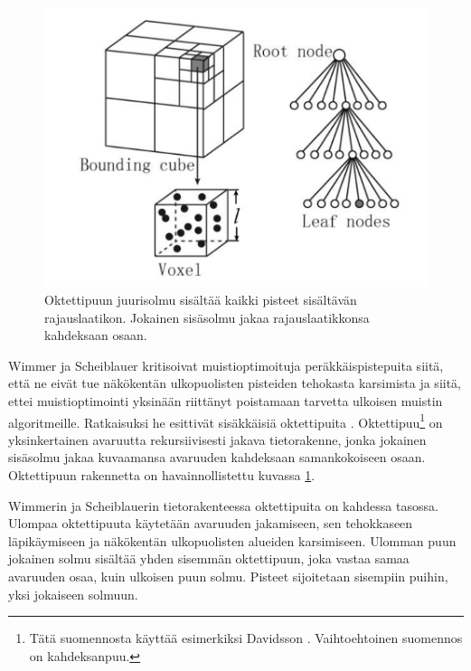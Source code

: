 \begin{figure}
    \centering
    \includegraphics[width=0.5\paperwidth]{img/octree.png}
    \caption{Oktettipuun juurisolmu sisältää kaikki pisteet sisältävän rajauslaatikon. Jokainen sisäsolmu jakaa rajauslaatikkonsa kahdeksaan osaan. \cite{octreekuva}}
    \label{img:octree}
\end{figure}

Wimmer ja Scheiblauer kritisoivat muistioptimoituja peräkkäispistepuita siitä, että ne eivät tue näkökentän ulkopuolisten pisteiden tehokasta karsimista ja siitä, ettei muistioptimointi yksinään riittänyt poistamaan tarvetta ulkoisen muistin algoritmeille. Ratkaisuksi he esittivät sisäkkäisiä oktettipuita . Oktettipuu\footnote{Tätä suomennosta käyttää esimerkiksi Davidsson \cite{oktettipuu}. Vaihtoehtoinen suomennos on kahdeksanpuu.} on yksinkertainen avaruutta rekursiivisesti jakava tietorakenne, jonka jokainen sisäsolmu jakaa kuvaamansa avaruuden kahdeksaan samankokoiseen osaan. Oktettipuun rakennetta on havainnollistettu kuvassa \ref{img:octree}. 

Wimmerin ja Scheiblauerin tietorakenteessa oktettipuita on kahdessa tasossa. Ulompaa oktettipuuta käytetään avaruuden jakamiseen, sen tehokkaseen läpikäymiseen ja näkökentän ulkopuolisten alueiden karsimiseen. Ulomman puun jokainen solmu sisältää yhden sisemmän oktettipuun, joka vastaa samaa avaruuden osaa, kuin ulkoisen puun solmu. Pisteet sijoitetaan sisempiin puihin, yksi jokaiseen solmuun. \cite{ip}

